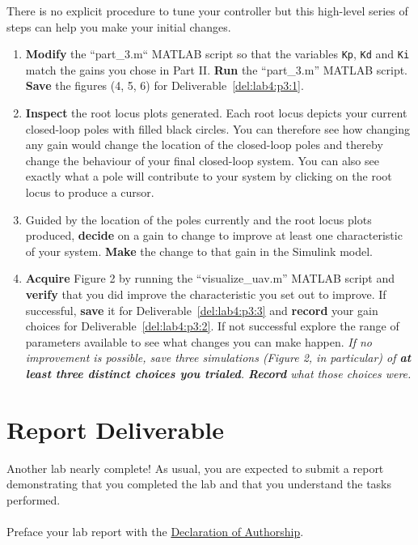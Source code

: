 \begin{procedure}[label={proc:lab4:tune}]
  There is no explicit procedure to tune your controller but this high-level series of steps can help you make your initial changes.
  \begin{enumerate}[label={(\arabic*)}]
    \item{%
      \textbf{Modify} the ``part\_3.m`` MATLAB script so that the variables \texttt{Kp}, \texttt{Kd} and \texttt{Ki} match the gains you chose in Part II.
      \textbf{Run} the ``part\_3.m'' MATLAB script.
      \textbf{Save} the figures (4, 5, 6) for Deliverable~\ref{del:lab4:p3:1}.
    }
    \item{%
      \textbf{Inspect} the root locus plots generated.
      Each root locus depicts your current closed-loop poles with filled black circles.
      You can therefore see how changing any gain would change the location of the closed-loop poles and thereby change the behaviour of your final closed-loop system.
      You can also see exactly what a pole will contribute to your system by clicking on the root locus to produce a cursor.
    }
    \item{%
      Guided by the location of the poles currently and the root locus plots produced, \textbf{decide} on a gain to change to improve at least one characteristic of your system.
      \textbf{Make} the change to that gain in the Simulink model. 
    }
    \item{%
      \textbf{Acquire} Figure 2 by running the ``visualize\_uav.m'' MATLAB script and \textbf{verify} that you did improve the characteristic you set out to improve.
      If successful, \textbf{save} it for Deliverable~\ref{del:lab4:p3:3} and \textbf{record} your gain choices for Deliverable~\ref{del:lab4:p3:2}.
      If not successful explore the range of parameters available to see what changes you can make happen.
      \emph{If no improvement is possible, save three simulations (Figure 2, in particular) of \textbf{at least three distinct choices you trialed}. \textbf{Record} what those choices were.}
    }
  \end{enumerate}
\end{procedure}

\section{Report Deliverable}\label{Lab:4:Report}
Another lab nearly complete!
As usual, you are expected to submit a report demonstrating that you completed the lab and that you understand the tasks performed.\\
\\
Preface your lab report with the \hyperlink{intro:decl}{Declaration of Authorship}.\\

